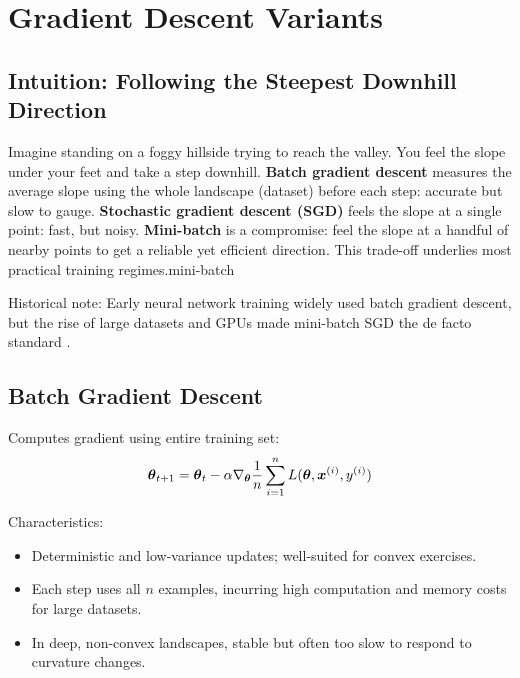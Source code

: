 
\section{Gradient Descent Variants }
\label{sec:gd-variants}

\subsection{Intuition: Following the Steepest Downhill Direction}

Imagine standing on a foggy hillside trying to reach the valley. You feel the slope under your feet and take a step downhill. \textbf{Batch gradient descent} measures the average slope using the whole landscape (dataset) before each step: accurate but slow to gauge. \textbf{Stochastic gradient descent (SGD)} feels the slope at a single point: fast, but noisy. \textbf{Mini-batch} is a compromise: feel the slope at a handful of nearby points to get a reliable yet efficient direction. This trade-off underlies most practical training regimes.\gls{mini-batch}

Historical note: Early neural network training widely used batch gradient descent, but the rise of large datasets and GPUs made mini-batch SGD the de facto standard \cite{GoodfellowEtAl2016,Prince2023}.

\subsection{Batch Gradient Descent}

Computes gradient using entire training set:
\begin{equation}
\boldsymbol{\theta}_{t+1} = \boldsymbol{\theta}_t - \alpha \nabla_{\boldsymbol{\theta}} \frac{1}{n} \sum_{i=1}^{n} L(\boldsymbol{\theta}, \boldsymbol{x}^{(i)}, y^{(i)})
\end{equation}

Characteristics:
\begin{itemize}
    \item Deterministic and low-variance updates; well-suited for convex exercises.
    \item Each step uses all \(n\) examples, incurring high computation and memory costs for large datasets.
    \item In deep, non-convex landscapes, stable but often too slow to respond to curvature changes.
\end{itemize}

